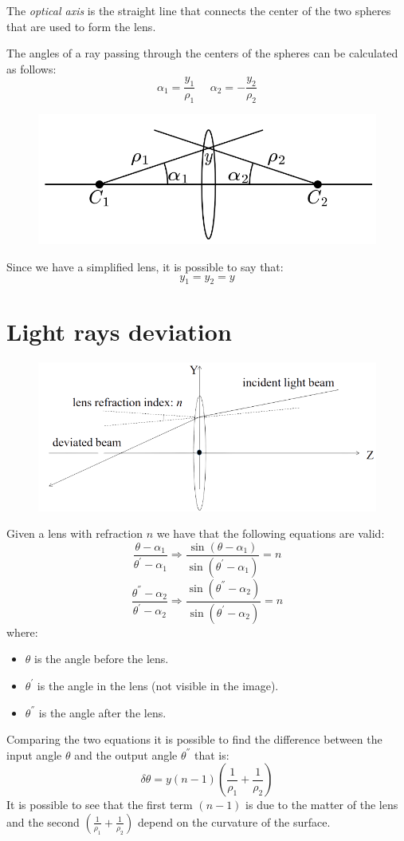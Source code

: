 \documentclass[12pt, a4paper]{report}
\newtheorem[style=M,bodystyle=\normalfont]{theorem}{Theorem}
\newtheorem[style=M,bodystyle=\normalfont]{corollary}{Corollary}
\newtheorem[style=M,bodystyle=\normalfont]{lemma}{Lemma}
\newtheorem[style=M,bodystyle=\normalfont]{definition}{Definition}
\begin{document}
    \begin{definition}
        The \emph{optical axis} is the straight line that connects the center of the two spheres that are used to form the lens. 
    \end{definition}
    The angles of a ray passing through the centers of the spheres can be calculated as follows: 
    \[\alpha_1=\dfrac{y_1}{\rho_1} \:\:\:\:\:\: \alpha_2=-\dfrac{y_2}{\rho_2}\]
    \begin{figure}[H]
        \centering
        \includegraphics[width=0.5\linewidth]{images/y.png}
    \end{figure}
    Since we have a simplified lens, it is possible to say that:
    \[y_1=y_2=y\]
    
    \section{Light rays deviation}
    \begin{figure}[H]
        \centering
       \includegraphics[width=0.5\linewidth]{images/ray.png}
   \end{figure}
    Given a lens with refraction $n$ we have that the following equations are valid:
    \[\dfrac{\theta-\alpha_1}{\theta^{'}-\alpha_1} \Rightarrow \dfrac{\sin{(\theta-\alpha_1)}}{\sin{(\theta^{'}-\alpha_1)}}=n\]
    \[\dfrac{\theta^{''}-\alpha_2}{\theta^{'}-\alpha_2} \Rightarrow \dfrac{\sin{(\theta^{''}-\alpha_2)}}{\sin{(\theta^{'}-\alpha_2)}}=n\]
    where:
    \begin{itemize}
        \item $\theta$ is the angle before the lens. 
        \item $\theta^{'}$ is the angle in the lens (not visible in the image). 
        \item $\theta^{''}$ is the angle after the lens.
    \end{itemize}
    Comparing the two equations it is possible to find the difference between the input angle $\theta$ and the output angle $\theta^{''}$ that is: 
    \[\delta \theta=y(n-1)\left( \dfrac{1}{\rho_1} + \dfrac{1}{\rho_2}\right)\]
    It is possible to see that the first term $(n-1)$ is due to the matter of the lens and the second $\left( \frac{1}{\rho_1} + \frac{1}{\rho_2}\right)$ depend on the curvature 
    of the surface. 
\end{document}
